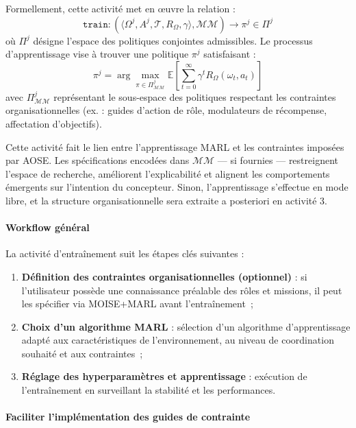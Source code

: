Formellement, cette activité met en œuvre la relation :
\[
    \texttt{train}: \left( \langle \Omega^j, A^j, \mathcal{T}, R_{\Omega}, \gamma \rangle, \mathcal{MM} \right) \longrightarrow \pi^j \in \Pi^j
\]
où $\Pi^j$ désigne l'espace des politiques conjointes admissibles. Le processus d'apprentissage vise à trouver une politique $\pi^j$ satisfaisant :
\[
    \pi^j = \arg\max_{\pi \in \Pi^j_{\mathcal{MM}}} \mathbb{E} \left[ \sum_{t=0}^{\infty} \gamma^t R_{\Omega}(\omega_t, a_t) \right]
\]
avec $\Pi^j_{\mathcal{MM}}$ représentant le sous-espace des politiques respectant les contraintes organisationnelles (ex. : guides d'action de rôle, modulateurs de récompense, affectation d'objectifs).

Cette activité fait le lien entre l'apprentissage MARL et les contraintes imposées par AOSE. Les spécifications encodées dans $\mathcal{MM}$ — si fournies — restreignent l'espace de recherche, améliorent l'explicabilité et alignent les comportements émergents sur l'intention du concepteur. Sinon, l'apprentissage s'effectue en mode libre, et la structure organisationnelle sera extraite a posteriori en activité 3.

\paragraph{Workflow général}

La activité d'entraînement suit les étapes clés suivantes :
\begin{enumerate}
    \item \textbf{Définition des contraintes organisationnelles (optionnel)} : si l'utilisateur possède une connaissance préalable des rôles et missions, il peut les spécifier via MOISE+MARL avant l'entraînement~;

    \item \textbf{Choix d'un algorithme MARL} : sélection d'un algorithme d'apprentissage adapté aux caractéristiques de l'environnement, au niveau de coordination souhaité et aux contraintes~;

    \item \textbf{Réglage des hyperparamètres et apprentissage} : exécution de l'entraînement en surveillant la stabilité et les performances.
\end{enumerate}

\paragraph{Faciliter l'implémentation des guides de contrainte}

